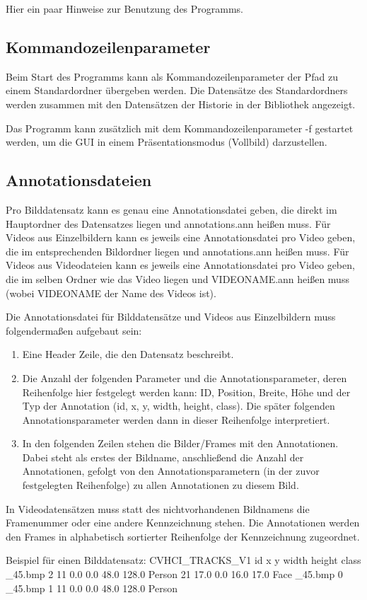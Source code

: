 Hier ein paar Hinweise zur Benutzung des Programms.

\subsection{Kommandozeilenparameter}
Beim Start des Programms kann als Kommandozeilenparameter der Pfad zu einem Standardordner übergeben werden. Die Datensätze des Standardordners werden zusammen mit den Datensätzen der Historie in der Bibliothek angezeigt.

Das Programm kann zusätzlich mit dem Kommandozeilenparameter -f gestartet werden, um die GUI in einem Präsentationsmodus (Vollbild) darzustellen.

\subsection{Annotationsdateien}
Pro Bilddatensatz kann es genau eine Annotationsdatei geben, die direkt im Hauptordner des Datensatzes liegen und annotations.ann heißen muss.
Für Videos aus Einzelbildern kann es jeweils eine Annotationsdatei pro Video geben, die im entsprechenden Bildordner liegen und annotations.ann heißen muss.
Für Videos aus Videodateien kann es jeweils eine Annotationsdatei pro Video geben, die im selben Ordner wie das Video liegen und VIDEONAME.ann heißen muss (wobei VIDEONAME der Name des Videos ist).

Die Annotationsdatei für Bilddatensätze und Videos aus Einzelbildern muss folgendermaßen aufgebaut sein:
\begin{enumerate}
\item Eine Header Zeile, die den Datensatz beschreibt.
\item Die Anzahl der folgenden Parameter und die Annotationsparameter, deren Reihenfolge hier festgelegt werden kann: ID, Position, Breite, Höhe und der Typ der Annotation (id, x, y, width, height, class). Die später folgenden Annotationsparameter werden dann in dieser Reihenfolge interpretiert.
\item In den folgenden Zeilen stehen die Bilder/Frames mit den Annotationen. Dabei steht als erstes der Bildname, anschließend die Anzahl der Annotationen, gefolgt von den Annotationsparametern (in der zuvor festgelegten Reihenfolge) zu allen Annotationen zu diesem Bild.
\end{enumerate}

In Videodatensätzen muss statt des nichtvorhandenen Bildnamens die Framenummer oder eine andere Kennzeichnung stehen. Die Annotationen werden den Frames in alphabetisch sortierter Reihenfolge der Kennzeichnung zugeordnet.

Beispiel für einen Bilddatensatz: \newline\newline
CVHCI\_TRACKS\_V1  id x y width height class \_45.bmp 2 11 0.0 0.0 48.0 128.0 Person 21 17.0 0.0 16.0 17.0 Face \_45.bmp 0 \_45.bmp 1 11 0.0 0.0 48.0 128.0 Person \newline
